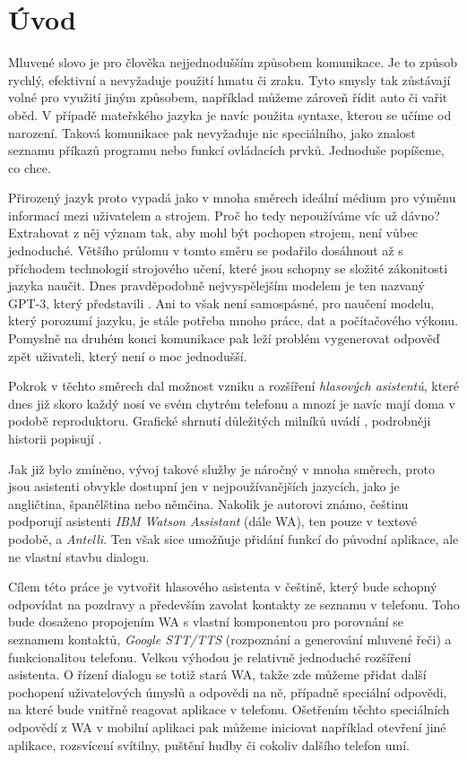 \chapter*{Úvod}

Mluvené slovo je pro člověka nejjednodušším způsobem komunikace. Je to
způsob rychlý, efektivní a nevyžaduje použití hmatu či zraku. Tyto smysly
tak zůstávají volné pro využití jiným způsobem, například můžeme zároveň
řídit auto či vařit oběd. V případě mateřského jazyka je navíc použita
syntaxe, kterou se učíme od narození. Taková komunikace pak nevyžaduje
nic speciálního, jako znalost seznamu příkazů programu nebo funkcí
ovládacích prvků. Jednoduše popíšeme, co chce.

Přirozený jazyk proto vypadá jako v mnoha směrech ideální médium pro výměnu
informací mezi uživatelem a strojem. Proč ho tedy nepoužíváme víc už dávno?
Extrahovat z něj význam tak, aby mohl být pochopen strojem, není vůbec
jednoduché. Většího průlomu v tomto směru se podařilo dosáhnout až s příchodem
technologií strojového učení, které jsou schopny se složité zákonitosti
jazyka  naučit. Dnes pravděpodobně nejvyspělejším modelem je
ten nazvaný GPT-3, který představili \citet{brown_language_2020}.
Ani to však není samospásné, pro naučení modelu,
který porozumí jazyku, je stále potřeba mnoho práce, dat a počítačového
výkonu. Pomyslně na druhém konci komunikace pak leží problém vygenerovat
odpověď zpět uživateli, který není o moc jednodušší.

Pokrok v těchto směrech dal možnost vzniku a rozšíření
\textit{hlasových asistentů}, které dnes již skoro každý nosí ve svém
chytrém telefonu a mnozí je navíc mají doma v podobě 
reproduktoru. Grafické shrnutí důležitých milníků uvádí \citet{voicebotai_2021},
podrobněji historii popisují \citet[strany 523-524]{jurafsky_slp_2020}.

Jak již bylo zmíněno, vývoj takové služby je náročný v mnoha
směrech, proto jsou asistenti obvykle dostupní jen v nejpoužívanějších
jazycích, jako je angličtina, španělština nebo němčina. Nakolik je autorovi
známo, češtinu podporují asistenti \textit{IBM Watson Assistant}
(dále WA), ten pouze v textové podobě, a \textit{Antelli}. Ten však sice
umožňuje přidání funkcí do původní aplikace, ale ne vlastní stavbu dialogu.

Cílem této práce je vytvořit hlasového asistenta v češtině, který bude schopný
odpovídat na pozdravy a především zavolat kontakty ze seznamu v telefonu.
Toho bude dosaženo propojením WA s vlastní komponentou
pro porovnání se seznamem kontaktů, \textit{Google STT/TTS}
(rozpoznání a generování mluvené řeči) a funkcionalitou telefonu. Velkou výhodou
je relativně jednoduché rozšíření asistenta. O řízení dialogu se totiž stará WA,
takže zde můžeme přidat další pochopení uživatelových úmyslů a odpovědi na ně,
případně speciální odpovědi, na které bude vnitřně reagovat aplikace v telefonu.
Ošetřením těchto speciálních odpovědí z WA v mobilní aplikaci pak můžeme
iniciovat například otevření jiné aplikace, rozsvícení svítilny, puštění
hudby či cokoliv dalšího telefon umí.

